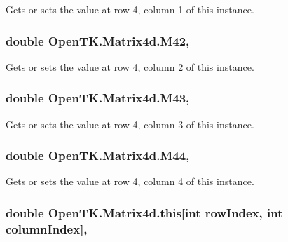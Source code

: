 Gets or sets the value at row 4, column 1 of this instance. 

\hypertarget{struct_open_t_k_1_1_matrix4d_a701e2b458bdd86326fd6fd296ac591fc}{
\subsubsection[{M42}]{\setlength{\rightskip}{0pt plus 5cm}double Open\-T\-K.\-Matrix4d.\-M42\hspace{0.3cm}{\ttfamily [get]}, {\ttfamily [set]}}}\label{struct_open_t_k_1_1_matrix4d_a701e2b458bdd86326fd6fd296ac591fc}


Gets or sets the value at row 4, column 2 of this instance. 

\hypertarget{struct_open_t_k_1_1_matrix4d_a5e32eefc79589f2f30b440967dceda54}{
\subsubsection[{M43}]{\setlength{\rightskip}{0pt plus 5cm}double Open\-T\-K.\-Matrix4d.\-M43\hspace{0.3cm}{\ttfamily [get]}, {\ttfamily [set]}}}\label{struct_open_t_k_1_1_matrix4d_a5e32eefc79589f2f30b440967dceda54}


Gets or sets the value at row 4, column 3 of this instance. 

\hypertarget{struct_open_t_k_1_1_matrix4d_a3a3a0502b585d932040fc01f0e4b6659}{
\subsubsection[{M44}]{\setlength{\rightskip}{0pt plus 5cm}double Open\-T\-K.\-Matrix4d.\-M44\hspace{0.3cm}{\ttfamily [get]}, {\ttfamily [set]}}}\label{struct_open_t_k_1_1_matrix4d_a3a3a0502b585d932040fc01f0e4b6659}


Gets or sets the value at row 4, column 4 of this instance. 

\hypertarget{struct_open_t_k_1_1_matrix4d_a0741a640da248787ba1d711b568b5e70}{
\subsubsection[{this[int row\-Index, int column\-Index]}]{\setlength{\rightskip}{0pt plus 5cm}double Open\-T\-K.\-Matrix4d.\-this\mbox{[}int row\-Index, int column\-Index\mbox{]}\hspace{0.3cm}{\ttfamily [get]}, {\ttfamily [set]}}}\label{struct_open_t_k_1_1_matrix4d_a0741a640da248787ba1d711b568b5e70}


